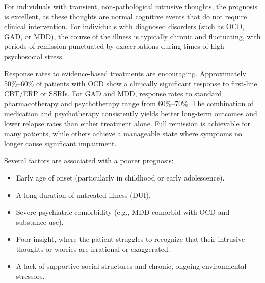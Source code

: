 For individuals with transient, non-pathological intrusive thoughts, the prognosis is excellent, as these thoughts are normal cognitive events that do not require clinical intervention. For individuals with diagnosed disorders (such as OCD, GAD, or MDD), the course of the illness is typically chronic and fluctuating, with periods of remission punctuated by exacerbations during times of high psychosocial stress.

Response rates to evidence-based treatments are encouraging. Approximately 50\%--60\% of patients with OCD show a clinically significant response to first-line CBT/ERP or SSRIs. For GAD and MDD, response rates to standard pharmacotherapy and psychotherapy range from 60\%--70\%. The combination of medication and psychotherapy consistently yields better long-term outcomes and lower relapse rates than either treatment alone. Full remission is achievable for many patients, while others achieve a manageable state where symptoms no longer cause significant impairment.

Several factors are associated with a poorer prognosis:
\begin{itemize}
  \item Early age of onset (particularly in childhood or early adolescence).
  \item A long duration of untreated illness (DUI).
  \item Severe psychiatric comorbidity (e.g., MDD comorbid with OCD and substance use).
  \item Poor insight, where the patient struggles to recognize that their intrusive thoughts or worries are irrational or exaggerated.
  \item A lack of supportive social structures and chronic, ongoing environmental stressors.
\end{itemize}

